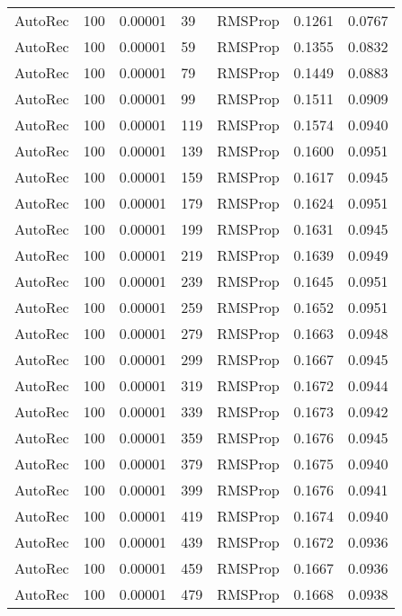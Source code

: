 \begin{tabular}{llrllrr}
 AutoRec &  100 &  0.00001 &    39 &   RMSProp &  0.1261 &       0.0767 \\
 AutoRec &  100 &  0.00001 &    59 &   RMSProp &  0.1355 &       0.0832 \\
 AutoRec &  100 &  0.00001 &    79 &   RMSProp &  0.1449 &       0.0883 \\
 AutoRec &  100 &  0.00001 &    99 &   RMSProp &  0.1511 &       0.0909 \\
 AutoRec &  100 &  0.00001 &   119 &   RMSProp &  0.1574 &       0.0940 \\
 AutoRec &  100 &  0.00001 &   139 &   RMSProp &  0.1600 &       0.0951 \\
 AutoRec &  100 &  0.00001 &   159 &   RMSProp &  0.1617 &       0.0945 \\
 AutoRec &  100 &  0.00001 &   179 &   RMSProp &  0.1624 &       0.0951 \\
 AutoRec &  100 &  0.00001 &   199 &   RMSProp &  0.1631 &       0.0945 \\
 AutoRec &  100 &  0.00001 &   219 &   RMSProp &  0.1639 &       0.0949 \\
 AutoRec &  100 &  0.00001 &   239 &   RMSProp &  0.1645 &       0.0951 \\
 AutoRec &  100 &  0.00001 &   259 &   RMSProp &  0.1652 &       0.0951 \\
 AutoRec &  100 &  0.00001 &   279 &   RMSProp &  0.1663 &       0.0948 \\
 AutoRec &  100 &  0.00001 &   299 &   RMSProp &  0.1667 &       0.0945 \\
 AutoRec &  100 &  0.00001 &   319 &   RMSProp &  0.1672 &       0.0944 \\
 AutoRec &  100 &  0.00001 &   339 &   RMSProp &  0.1673 &       0.0942 \\
 AutoRec &  100 &  0.00001 &   359 &   RMSProp &  0.1676 &       0.0945 \\
 AutoRec &  100 &  0.00001 &   379 &   RMSProp &  0.1675 &       0.0940 \\
 AutoRec &  100 &  0.00001 &   399 &   RMSProp &  0.1676 &       0.0941 \\
 AutoRec &  100 &  0.00001 &   419 &   RMSProp &  0.1674 &       0.0940 \\
 AutoRec &  100 &  0.00001 &   439 &   RMSProp &  0.1672 &       0.0936 \\
 AutoRec &  100 &  0.00001 &   459 &   RMSProp &  0.1667 &       0.0936 \\
 AutoRec &  100 &  0.00001 &   479 &   RMSProp &  0.1668 &       0.0938 \\

\end{tabular}
